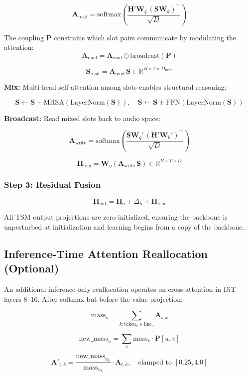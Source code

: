 \documentclass[11pt,a4paper]{article}
\begin{document}
\[
\mathbf{A}_{\text{read}} = \text{softmax}\!\left(\frac{\mathbf{H}' \mathbf{W}_q \, (\mathbf{S} \mathbf{W}_k)^\top}{\sqrt{D}}\right)
\]

The coupling $\mathbf{P}$ constrains which slot pairs communicate by modulating the attention:
\[
\mathbf{A}_{\text{mod}} = \mathbf{A}_{\text{read}} \odot \text{broadcast}(\mathbf{P})
\]

\[
\mathbf{S}_{\text{read}} = \mathbf{A}_{\text{mod}} \, \mathbf{S} \in \mathbb{R}^{B \times T \times D_{\text{mem}}}
\]

\textbf{Mix:} Multi-head self-attention among slots enables structural reasoning:

\[
\mathbf{S} \leftarrow \mathbf{S} + \text{MHSA}(\text{LayerNorm}(\mathbf{S})),
\quad
\mathbf{S} \leftarrow \mathbf{S} + \text{FFN}(\text{LayerNorm}(\mathbf{S}))
\]

\textbf{Broadcast:} Read mixed slots back to audio space:

\[
\mathbf{A}_{\text{write}} = \text{softmax}\!\left(\frac{\mathbf{S} \mathbf{W}_q' \, (\mathbf{H}' \mathbf{W}_k')^\top}{\sqrt{D}}\right)
\]

\[
\mathbf{H}_{\text{tsm}} = \mathbf{W}_o(\mathbf{A}_{\text{write}} \, \mathbf{S}) \in \mathbb{R}^{B \times T \times D}
\]

\subsubsection{Step 3: Residual Fusion}

\[
\mathbf{H}_{\text{out}} = \mathbf{H}_o + \Delta_h + \mathbf{H}_{\text{tsm}}
\]

All TSM output projections are zero-initialized, ensuring the backbone is unperturbed at initialization and learning begins from a copy of the backbone.

\subsection{Inference-Time Attention Reallocation (Optional)}

An additional inference-only reallocation operates on cross-attention in DiT layers 8--16. After softmax but before the value projection:

\[
\text{mass}_u = \sum_{k: \text{token}_k \in \text{line}_u} \mathbf{A}_{t,k}
\]

\[
\text{new\_mass}_u = \sum_v \text{mass}_v \cdot \mathbf{P}[u, v]
\]

\[
\mathbf{A}'_{t,k} = \frac{\text{new\_mass}_{u_k}}{\text{mass}_{u_k}} \cdot \mathbf{A}_{t,k},
\quad \text{clamped to } [0.25, 4.0]
\]
\end{document}
